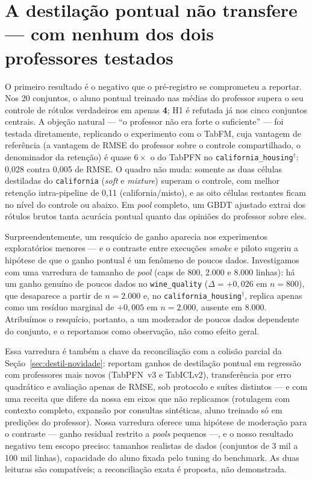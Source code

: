 \section{A destilação pontual não transfere --- com nenhum dos dois professores testados}
\label{sec:destil-ponto}

O primeiro resultado é o negativo que o pré-registro se comprometeu a
reportar. Nos 20 conjuntos, o aluno pontual treinado nas médias do
professor supera o seu controle de rótulos verdadeiros em apenas
\textbf{4}; H1 é refutada já nos cinco conjuntos centrais. A objeção
natural --- ``o professor não era forte o suficiente'' --- foi testada
diretamente, replicando o experimento com o TabFM, cuja vantagem de referência
(a vantagem de RMSE do professor sobre o controle compartilhado, o
denominador da retenção) é quase $6\times$ o do TabPFN no
\texttt{california\_\allowbreak housing}$^\dagger$: 0,028 contra
0,005 de RMSE. O quadro não
muda: somente as duas células destiladas do \texttt{california}
(\emph{soft} e \emph{mixture})
superam o controle, com melhor retenção intra-pipeline de 0,11
(california/misto), e as oito células restantes ficam no nível do
controle ou abaixo. Em \emph{pool} completo, um GBDT ajustado extrai dos
rótulos brutos tanta acurácia pontual quanto das opiniões do professor
sobre eles.

Surpreendentemente, um resquício de ganho aparecia nos experimentos
exploratórios menores --- e o contraste entre execuções \emph{smoke} e
piloto sugeriu a hipótese de que o ganho pontual é um fenômeno de
poucos dados. Investigamos com uma varredura de tamanho de \emph{pool} (caps
de 800, 2.000 e 8.000 linhas): há um ganho genuíno de poucos dados no
\texttt{wine\_quality} ($\Delta = +0{,}026$ em $n{=}800$), que
desaparece a partir de $n{=}2.000$ e, no
\texttt{california\_\allowbreak housing}$^\dagger$, replica
apenas como um resíduo marginal de $+0{,}005$ em $n{=}2.000$, ausente
em 8.000. Atribuímos o resquício, portanto, a um
moderador de poucos dados dependente do conjunto, e o reportamos como
observação, não como efeito geral.

Essa varredura é também a chave da reconciliação com a colisão
parcial da Seção~\ref{sec:destil-novidade}: \citet{jeong2026} reportam
ganhos de destilação pontual em regressão com professores mais novos
(TabPFN~v3 e TabICLv2), transferência por erro quadrático e avaliação
apenas de RMSE, sob protocolo e suítes distintos --- e com uma receita
que difere da nossa em eixos que não replicamos (rotulagem com
contexto completo, expansão por consultas sintéticas, aluno treinado
só em predições do professor). Nossa varredura
oferece uma hipótese de moderação para o contraste --- ganho residual
restrito a \emph{pools} pequenos ---, e o nosso
resultado negativo tem escopo preciso: tamanhos realistas de dados
(conjuntos de 3 mil a
100 mil linhas), capacidade do aluno fixada pelo tuning do benchmark.
As duas leituras são compatíveis; a reconciliação exata é proposta,
não demonstrada.

